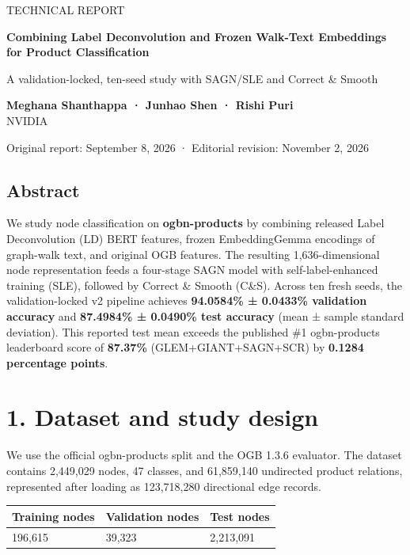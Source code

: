 \documentclass[10pt]{article}
\begin{document}
TECHNICAL REPORT\par

{\LARGE\bfseries Combining Label Deconvolution and Frozen Walk-Text Embeddings for Product Classification\par}

A validation-locked, ten-seed study with SAGN/SLE and Correct \& Smooth\par

\textbf{Meghana Shanthappa · Junhao Shen · Rishi Puri}\\ NVIDIA\par

{\small Original report: September 8, 2026 · Editorial revision: November 2, 2026\par}

\subsection*{Abstract}

We study node classification on \textbf{ogbn-products} by combining released Label Deconvolution (LD) BERT features, frozen EmbeddingGemma encodings of graph-walk text, and original OGB features. The resulting 1,636-dimensional node representation feeds a four-stage SAGN model with self-label-enhanced training (SLE), followed by Correct \& Smooth (C\&S). Across ten fresh seeds, the validation-locked v2 pipeline achieves \textbf{94.0584\% ± 0.0433\% validation accuracy} and \textbf{87.4984\% ± 0.0490\% test accuracy} (mean ± sample standard deviation). This reported test mean exceeds the published \#1 ogbn-products leaderboard score of \textbf{87.37\%} (GLEM+GIANT+SAGN+SCR) by \textbf{0.1284 percentage points}.\par

\section*{1. Dataset and study design}

We use the official ogbn-products split and the OGB 1.3.6 evaluator. The dataset contains 2,449,029 nodes, 47 classes, and 61,859,140 undirected product relations, represented after loading as 123,718,280 directional edge records.\par

\begin{longtable}{@{}p{2.213in}p{2.213in}p{2.213in}@{}}

\toprule

Training nodes & Validation nodes & Test nodes \\

\midrule

196,615 & 39,323 & 2,213,091 \\

\bottomrule\end{longtable}
\end{document}
